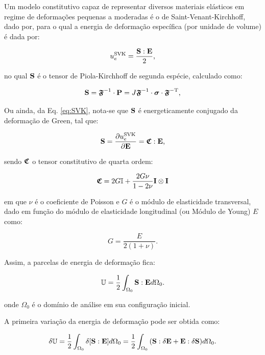 Um modelo constitutivo capaz de representar diversos materiais elásticos em regime de deformações pequenas a moderadas é o de Saint-Venant-Kirchhoff, dado por, para o qual a energia de deformação específica (por unidade de volume) é dada por:

\begin{equation}
    u_e^\mathrm{SVK}=\frac{\mathbf{S}:\mathbf{E}}{2}\text{,}
    \label{eq:SVK}
\end{equation}

\noindent no qual $\mathbf{S}$ é o tensor de Piola-Kirchhoff de segunda espécie, calculado como:

\begin{equation}
    \mathbf{S}=\boldsymbol{\mathfrak{F}}^{-1}\cdot\mathbf{P}=J\boldsymbol{\mathfrak{F}}^{-1}\cdot\boldsymbol{\sigma}\cdot\boldsymbol{\mathfrak{F}}^{-\mathrm{T}}\text{,}
    \label{eq:CSD-S0}
\end{equation}

Ou ainda, da Eq. \eqref{eq:SVK}, nota-se que $\mathbf{S}$ é energeticamente conjugado da deformação de Green, tal que:

\begin{equation}
    \mathbf{S}=\frac{\partial u_e^\mathrm{SVK}}{\partial\mathbf{E}}=\boldsymbol{\mathfrak{C}}:\mathbf{E}\text{,}
    \label{eq:CSD-S}
\end{equation}

\noindent sendo $\boldsymbol{\mathfrak{C}}$ o tensor constitutivo de quarta ordem:

\begin{equation}
    \boldsymbol{\mathfrak{C}}=2G\mathbb{I}+\frac{2G\nu}{1-2\nu}\mathbf{I}\otimes\mathbf{I}
\end{equation}

\noindent em que $\nu$ é o coeficiente de Poisson e $G$ é o módulo de elasticidade transversal, dado em função do módulo de elasticidade longitudinal (ou Módulo de Young) $E$ como:

\begin{equation}
    G=\frac{E}{2(1+\nu)}\text{.}
\end{equation}

Assim, a parcelas de energia de deformação fica:

\begin{equation}
    \mathbb{U}=\frac{1}{2}\int_{\Omega_0}{\mathbf{S}:\mathbf{E} d\Omega_0}\text{.}
\end{equation}

\noindent onde $\Omega_0$ é o domínio de análise em sua configuração inicial.

A primeira variação da energia de deformação pode ser obtida como:

\begin{equation}
    \delta\mathbb{U}=\frac{1}{2}\int_{\Omega_0}{\delta[\mathbf{S}:\mathbf{E}] d\Omega_0}=\frac{1}{2}\int_{\Omega_0}{(\mathbf{S}:\delta\mathbf{E}+\mathbf{E}:\delta\mathbf{S}) d\Omega_0}\text{.}
\end{equation}

